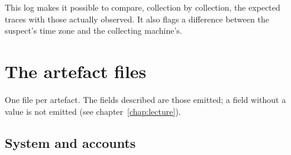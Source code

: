 \documentclass[11pt,a4paper,oneside]{report}
\begin{document}
This log makes it possible to compare, collection by collection, the expected
traces with those actually observed. It also flags a difference between the
suspect's time zone and the collecting machine's.

\section{The artefact files}

One file per artefact. The fields described are those emitted; a field without
a value is not emitted (see chapter~\ref{chap:lecture}).

\subsection{System and accounts}
\end{document}

